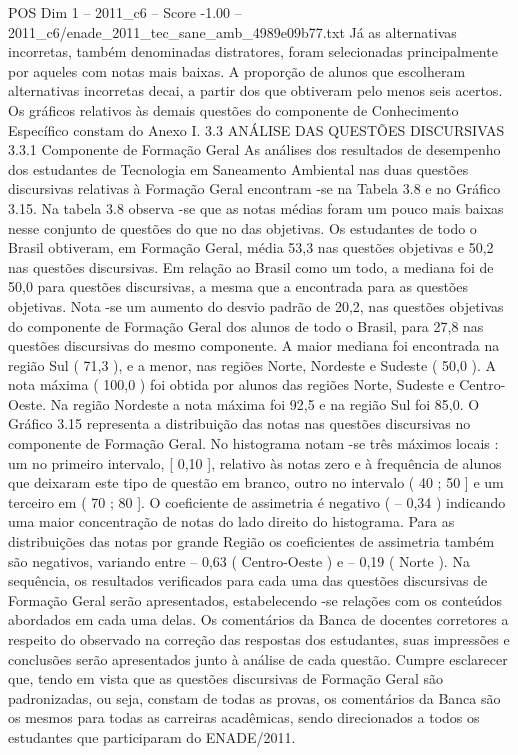 \begin{textsample}{POS Dim 1 – 2011\_c6 – Score -1.00 – 2011\_c6/enade\_2011\_tec\_sane\_amb\_4989e09b77.txt}
Já as alternativas incorretas, também denominadas distratores, foram selecionadas principalmente por aqueles com notas mais baixas.
A proporção de alunos que escolheram alternativas incorretas decai, a partir dos que obtiveram pelo menos seis acertos.
Os gráficos relativos às demais questões do componente de Conhecimento Específico constam do Anexo I. 3.3 ANÁLISE DAS QUESTÕES DISCURSIVAS 3.3.1 Componente de Formação Geral As análises dos resultados de desempenho dos estudantes de Tecnologia em Saneamento Ambiental nas duas questões discursivas relativas à Formação Geral encontram -se na Tabela 3.8 e no Gráfico 3.15.
Na tabela 3.8 observa -se que as notas médias foram um pouco mais baixas nesse conjunto de questões do que no das objetivas.
Os estudantes de todo o Brasil obtiveram, em Formação Geral, média 53,3 nas questões objetivas e 50,2 nas questões discursivas.
Em relação ao Brasil como um todo, a mediana foi de 50,0 para questões discursivas, a mesma que a encontrada para as questões objetivas.
Nota -se um aumento do desvio padrão de 20,2, nas questões objetivas do componente de Formação Geral dos alunos de todo o Brasil, para 27,8 nas questões discursivas do mesmo componente.
A maior mediana foi encontrada na região Sul ( 71,3 ), e a menor, nas regiões Norte, Nordeste e Sudeste ( 50,0 ).
A nota máxima ( 100,0 ) foi obtida por alunos das regiões Norte, Sudeste e Centro-Oeste.
Na região Nordeste a nota máxima foi 92,5 e na região Sul foi 85,0.
O Gráfico 3.15 representa a distribuição das notas nas questões discursivas no componente de Formação Geral.
No histograma notam -se três máximos locais : um no primeiro intervalo, [ 0,10 ], relativo às notas zero e à frequência de alunos que deixaram este tipo de questão em branco, outro no intervalo ( 40 ; 50 ] e um terceiro em ( 70 ; 80 ].
O coeficiente de assimetria é negativo ( – 0,34 ) indicando uma maior concentração de notas do lado direito do histograma.
Para as distribuições das notas por grande Região os coeficientes de assimetria também são negativos, variando entre – 0,63 ( Centro-Oeste ) e – 0,19 ( Norte ).
Na sequência, os resultados verificados para cada uma das questões discursivas de Formação Geral serão apresentados, estabelecendo -se relações com os conteúdos abordados em cada uma delas.
Os comentários da Banca de docentes corretores a respeito do observado na correção das respostas dos estudantes, suas impressões e conclusões serão apresentados junto à análise de cada questão.
Cumpre esclarecer que, tendo em vista que as questões discursivas de Formação Geral são padronizadas, ou seja, constam de todas as provas, os comentários da Banca são os mesmos para todas as carreiras acadêmicas, sendo direcionados a todos os estudantes que participaram do ENADE/2011.

\end{textsample}
